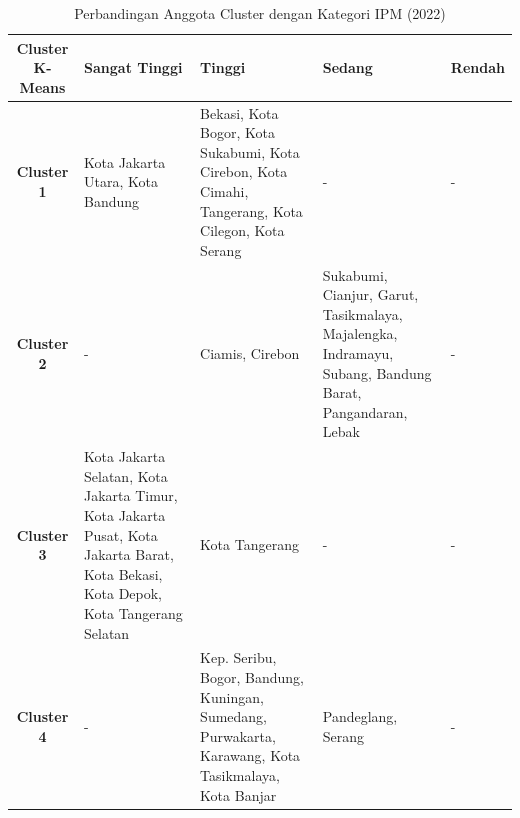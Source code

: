 \begin{table}[H]
\centering
\caption{Perbandingan Anggota Cluster dengan Kategori IPM (2022)} \label{tab:ipm_cross_2022}
\begin{tabular}{|c|p{2cm}|p{2cm}|p{2cm}|p{2cm}|}
\hline
\textbf{Cluster K-Means} & \textbf{Sangat Tinggi} & \textbf{Tinggi} & \textbf{Sedang} & \textbf{Rendah} \\ \hline
\textbf{Cluster 1} & Kota Jakarta Utara, Kota Bandung & Bekasi, Kota Bogor, Kota Sukabumi, Kota Cirebon, Kota Cimahi, Tangerang, Kota Cilegon, Kota Serang & - & - \\ \hline
\textbf{Cluster 2} & - & Ciamis, Cirebon & Sukabumi, Cianjur, Garut, Tasikmalaya, Majalengka, Indramayu, Subang, Bandung Barat, Pangandaran, Lebak & - \\ \hline
\textbf{Cluster 3} & Kota Jakarta Selatan, Kota Jakarta Timur, Kota Jakarta Pusat, Kota Jakarta Barat, Kota Bekasi, Kota Depok, Kota Tangerang Selatan & Kota Tangerang & - & - \\ \hline
\textbf{Cluster 4} & - & Kep. Seribu, Bogor, Bandung, Kuningan, Sumedang, Purwakarta, Karawang, Kota Tasikmalaya, Kota Banjar & Pandeglang, Serang & - \\ \hline
\end{tabular}
\end{table}